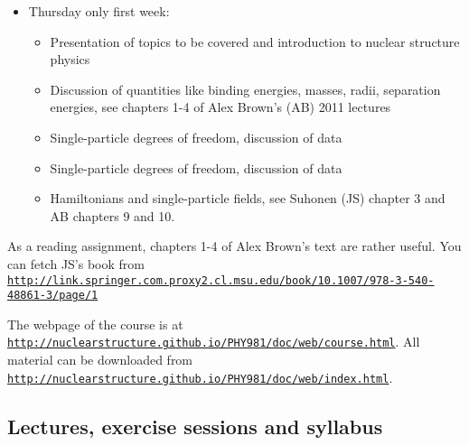 \documentclass[%
twoside,                 %
final,                   %
10pt]{article}
\begin{document}
\begin{itemize}
\item Thursday only first week:
\begin{itemize}

 \item Presentation of topics to be covered and introduction to nuclear structure physics

 \item Discussion of quantities like binding energies, masses, radii, separation energies, see chapters 1-4 of Alex Brown's (AB) 2011 lectures

 \item Single-particle degrees of freedom, discussion of data

 \item Single-particle degrees of freedom, discussion of data

 \item Hamiltonians and single-particle fields, see  Suhonen (JS) chapter 3  and AB chapters 9 and 10.
\end{itemize}

\noindent
\end{itemize}

\noindent
As a reading assignment, chapters 1-4 of Alex Brown's text are rather useful.
You can fetch JS's book from \href{{http://link.springer.com.proxy2.cl.msu.edu/book/10.1007/978-3-540-48861-3/page/1}}{\nolinkurl{http://link.springer.com.proxy2.cl.msu.edu/book/10.1007/978-3-540-48861-3/page/1}}

The webpage of the course is at \href{{http://nuclearstructure.github.io/PHY981/doc/web/course.html}}{\nolinkurl{http://nuclearstructure.github.io/PHY981/doc/web/course.html}}.
All material can be downloaded from \href{{http://nuclearstructure.github.io/PHY981/doc/web/index.html}}{\nolinkurl{http://nuclearstructure.github.io/PHY981/doc/web/index.html}}.




\subsection*{Lectures, exercise sessions and syllabus}

\end{document}

